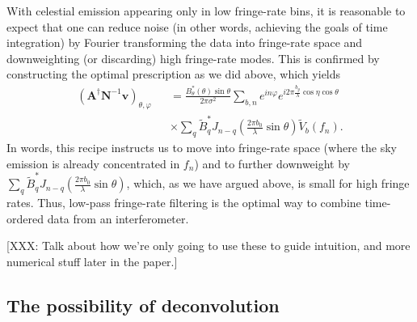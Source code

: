 \documentclass[twocolumn,apj,numberedappendix]{emulateapj}
\newcommand{\vis}{\mathbf{v}}
\newcommand{\A}{\mathbf{A}}
\newcommand{\N}{\mathbf{N}}
\begin{document}
With celestial emission appearing only in low fringe-rate bins, it is
reasonable to expect that one can reduce noise (in other words, achieving the
goals of time integration) by Fourier transforming the data into fringe-rate
space and downweighting (or discarding) high fringe-rate modes.  This is
confirmed by constructing the optimal prescription as we did above, which
yields
\begin{eqnarray}
\label{eq:AdagNinvv}
\left( \A^\dagger \N^{-1} \vis \right)_{\theta,\varphi} && = \frac{B_\theta^* (\theta)  \sin \theta}{2\pi \sigma^2} \sum_{b,n} e^{i n \varphi} e^{i 2 \pi  \frac{b_y}{\lambda} \cos \eta \cos \theta} \nonumber \\
&& \times \sum_{q} \widetilde{B}_q^* J_{n-q} \left( \frac{2 \pi b_0}{\lambda} \sin \theta \right) \widetilde{V}_b (f_n).
\end{eqnarray}
In words, this recipe instructs us to move into fringe-rate space (where the
sky emission is already concentrated in $f_n$) and to further downweight by
$\sum_{q} \widetilde{B}_q^* J_{n-q} \left( \frac{2 \pi b_0}{\lambda} \sin
\theta \right)$, which, as we have argued above, is small for high fringe
rates.  Thus, low-pass fringe-rate filtering is the optimal way to combine
time-ordered data from an interferometer.

[XXX: Talk about how we're only going to use these to guide intuition, and more numerical stuff later in the paper.]

\subsection{The possibility of deconvolution}
\end{document}
